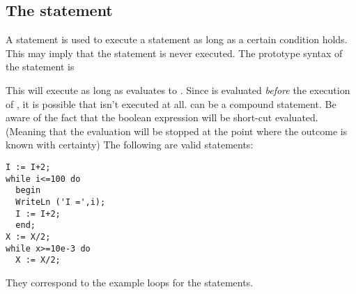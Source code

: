 \documentclass{report}
\begin{document}
\subsection{The  statement}
A  statement is used to execute a statement as long as a certain
condition holds. This may imply that the statement is never executed.
The prototype syntax of the  statement is

This will execute  as long as  evaluates to
. Since  is evaluated {\em before} the execution
of , it is possible that  isn't executed at
all.  can be a compound statement.
Be aware of the fact that the boolean expression  will be
short-cut evaluated. (Meaning that the evaluation will be stopped at the
point where the outcome is known with certainty)
The following are valid  statements:
\begin{verbatim}
I := I+2;
while i<=100 do
  begin
  WriteLn ('I =',i);
  I := I+2;
  end;
X := X/2;
while x>=10e-3 do
  X := X/2;
\end{verbatim}
They correspond to the example loops for the  statements.
\end{document}
